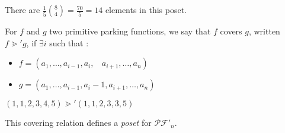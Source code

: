 \begin{example}
\begin{center}
\begin{tikzpicture}[scale = 0.3]
        \end{tikzpicture}
        ~\\
        ~\\
        There are $\frac {1}{5} \binom{8}{4} = \frac{70}{5} = 14$
        elements in this poset.
    \end{center}
\end{example}

\begin{definition}[$\gtrdot'$]
    For $f$ and $g$ two primitive parking functions, we say
    that $f$ covers $g$, written $f \gtrdot' g$, if
    $\exists i$ such that :
    \begin{itemize}
        \item $f = (a_1, \ldots, a_{i-1}, a_i,\ \ \ \ 
            a_{i+1}, \ldots, a_n)$
        \item $g = (a_1, \ldots, a_{i-1}, a_i - 1, a_{i+1},
        \ldots, a_n)$
    \end{itemize}
\end{definition}

\begin{example}[$n = 6$]
    $(1, 1, 2, 3, 4, 5) \gtrdot' (1, 1, 2, 3, 3, 5)$    
\end{example}

\begin{prop}
    This covering relation defines a \emph{poset}
    for $\mathcal{PF'}_n$.
\end{prop}

